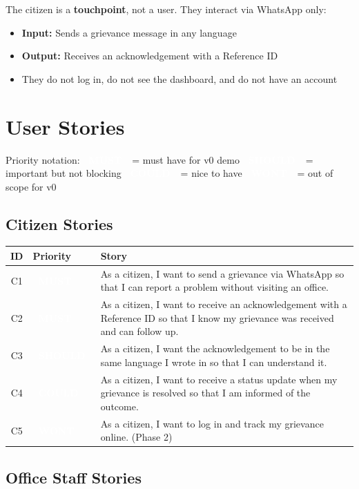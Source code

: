 \documentclass[11pt, a4paper]{article}
\newcommand{\must}{\textcolor{white}{\colorbox{mustcol}{\textbf{\ MUST\ }}}}
\newcommand{\should}{\textcolor{white}{\colorbox{shouldcol}{\textbf{\ SHOULD\ }}}}
\newcommand{\could}{\textcolor{white}{\colorbox{couldcol}{\textbf{\ COULD\ }}}}
\newcommand{\wont}{\textcolor{white}{\colorbox{wontcol}{\textbf{\ WONT\ }}}}
\begin{document}
The citizen is a \textbf{touchpoint}, not a user. They interact via WhatsApp only:
\begin{itemize}[leftmargin=1.5em]
  \item \textbf{Input:} Sends a grievance message in any language
  \item \textbf{Output:} Receives an acknowledgement with a Reference ID
  \item They do not log in, do not see the dashboard, and do not have an account
\end{itemize}

\newpage

\section{User Stories}

Priority notation: \must\ = must have for v0 demo \quad \should\ = important but not blocking \quad \could\ = nice to have \quad \wont\ = out of scope for v0

\subsection{Citizen Stories}

\renewcommand{\arraystretch}{1.4}
\begin{tabularx}{\linewidth}{clX}
\toprule
\textbf{ID} & \textbf{Priority} & \textbf{Story} \\
\midrule
C1 & \must   & As a citizen, I want to send a grievance via WhatsApp so that I can report a problem without visiting an office. \\
C2 & \must   & As a citizen, I want to receive an acknowledgement with a Reference ID so that I know my grievance was received and can follow up. \\
C3 & \should & As a citizen, I want the acknowledgement to be in the same language I wrote in so that I can understand it. \\
C4 & \could  & As a citizen, I want to receive a status update when my grievance is resolved so that I am informed of the outcome. \\
C5 & \wont   & As a citizen, I want to log in and track my grievance online. (Phase 2) \\
\bottomrule
\end{tabularx}

\subsection{Office Staff Stories}
\end{document}
